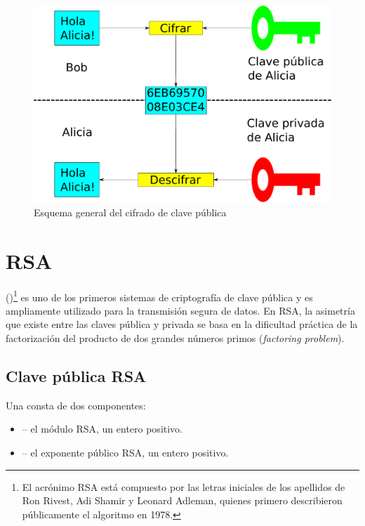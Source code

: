  \begin{figure}[ht]
   \centering
   \includegraphics[scale=0.5]{Figures/PublicKeyEncryption}
   \decoRule
   \caption[Cifrado de clave pública (Esquema)]{Esquema general del cifrado de clave pública}
   \label{fig:PublicKeyEncryption}
 \end{figure}


 \section{RSA}

  ()\footnote{El acrónimo RSA está compuesto por las letras iniciales de los apellidos de Ron Rivest, Adi Shamir y Leonard Adleman, quienes primero describieron públicamente el algoritmo en 1978.} es uno de los primeros sistemas de criptografía de clave pública y es ampliamente utilizado para la transmisión segura de datos.
 En RSA, la asimetría que existe entre las claves pública y privada se basa en la dificultad práctica de la factorización del producto de dos grandes números primos (\emph{factoring problem}). \emph{\parencite{Reference9}}

 \subsection{Clave pública RSA}

 Una  consta de dos componentes:
 \begin{itemize}
 \item {} -- el módulo RSA, un entero positivo.
 \item {} -- el exponente público RSA, un entero positivo.
 \end{itemize}

